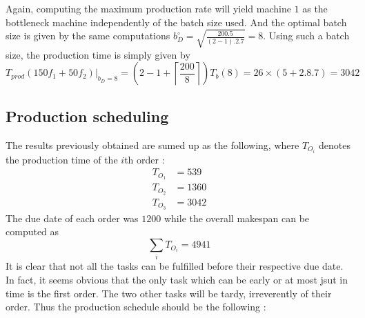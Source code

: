 Again, computing the maximum production rate will yield machine $1$ as the bottleneck machine independently of the batch size used. And the optimal batch size is given by the same computations $b_D^\circ = \sqrt{ \frac{200.5}{(2-1).2.7} } = 8$. Using such a batch size, the production time is simply given by 
\[
    T_{prod}(150f_1 + 50f_2)|_{b_D = 8} = \left(2-1+\left\lceil \frac{200}{8} \right\rceil\right)T_b(8)
    = 26\times(5+2.8.7) = 3042
\]

\subsection{Production scheduling}

The results previously obtained are sumed up as the following, where $T_{O_i}$ denotes the production time of the $i$th order :
\[
    \begin{split}
        T_{O_1} &= 539\\
        T_{O_2} &= 1360\\
        T_{O_3} &= 3042
    \end{split}
\]
The due date of each order was $1200$ while the overall makespan can be computed as \[ \sum_i T_{O_i} = 4941 \]
It is clear that not all the tasks can be fulfilled before their respective due date. In fact, it seems obvious that the only task which can be early or at most jsut in time is the first order. The two other tasks will be tardy, irreverently of their order. Thus the production schedule should be the following :
\begin{center}
\end{center}